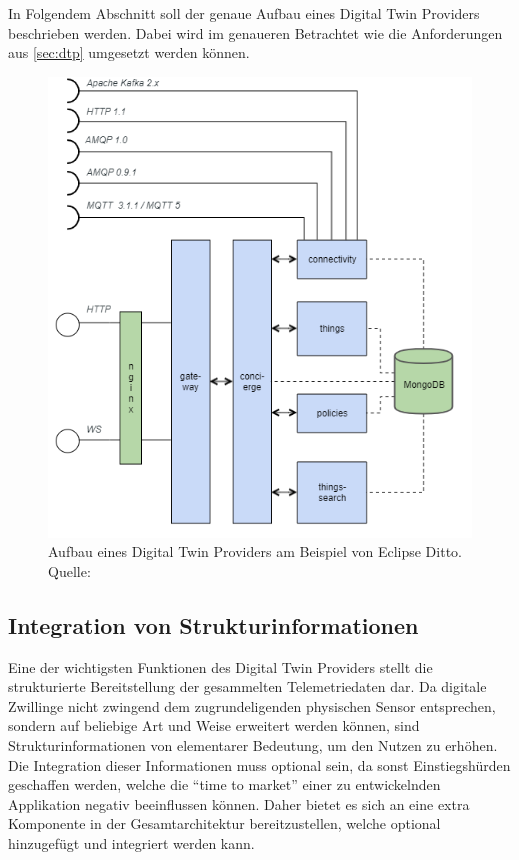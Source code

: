 In Folgendem Abschnitt soll der genaue Aufbau eines Digital Twin Providers beschrieben werden. Dabei wird im genaueren Betrachtet wie die Anforderungen aus \vref{sec:dtp} umgesetzt werden können.

\begin{figure}
    \centering
    \includegraphics[width=0.8\linewidth]{img/ditto_arch.png}
    \caption[Aufbau eines Digital Twin Providers]{Aufbau eines Digital Twin Providers am Beispiel von Eclipse Ditto.\\Quelle:}
    \label{fig:ditto_arch}
\end{figure}

\subsection*{Integration von Strukturinformationen}
Eine der wichtigsten Funktionen des Digital Twin Providers stellt die strukturierte Bereitstellung der gesammelten Telemetriedaten dar. Da digitale Zwillinge nicht zwingend dem zugrundeligenden physischen Sensor entsprechen, sondern auf beliebige Art und Weise erweitert werden können, sind Strukturinformationen von elementarer Bedeutung, um den Nutzen zu erhöhen. Die Integration dieser Informationen muss optional sein, da sonst Einstiegshürden geschaffen werden, welche die \enquote{time to market} einer zu entwickelnden Applikation negativ beeinflussen können. Daher bietet es sich an eine extra Komponente in der Gesamtarchitektur bereitzustellen, welche optional hinzugefügt und integriert werden kann.

